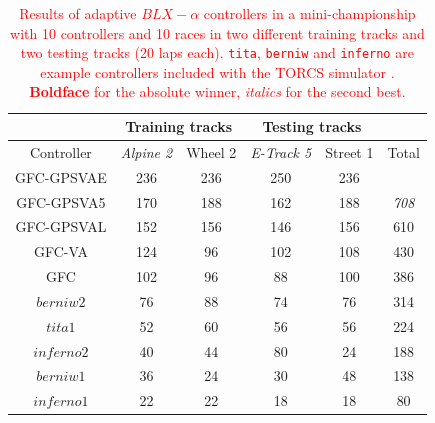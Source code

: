 \documentclass[10pt,journal,compsoc]{IEEEtran}
\begin{document}
%
\begin{table}[h!]
	\centering
	{\scriptsize
          \caption{\textcolor{red}{ Results of adaptive $BLX-\alpha$ controllers in a mini-championship with 10 controllers
          	and 10 races in two different training tracks and two testing tracks (20 laps each). {\tt tita}, {\tt berniw} and {\tt inferno} are example controllers included with the TORCS simulator \cite{torcs4}. {\bf Boldface} for the absolute winner, {\em italics} for the second best.}}
          {
            \begin{tabular}{|c|c|c|c|c||c|}
              \hline
                    & \multicolumn{2}{|c|}{Training tracks} &\multicolumn{2}{|c|}{Testing tracks} \\
              \hline
                    Controller&\textit{Alpine 2} &Wheel 2&\textit{E-Track 5}  &Street 1&Total\\
              \hline
              \hline	
              {\sf GFC-GPSVAE} &\cellcolor{red!25}236&\cellcolor{red!25}	236&\cellcolor{red!25}250&	\cellcolor{red!25}236&\cellcolor{red!25}{\bf 958}\\
              {\sf GFC-GPSVA5} \cite{DBLP:conf/cig/SalemMG19}&\cellcolor{red!25}170&\cellcolor{red!25}	188&\cellcolor{red!25}162&	\cellcolor{red!25}188&\cellcolor{red!25}	{\em 708}\\

				{\sf GFC-GPSVAL} \cite{DBLP:conf/cig/SalemMG19}&\cellcolor{red!25}152&	\cellcolor{red!25}156&\cellcolor{red!25}146&\cellcolor{red!25}	156&\cellcolor{red!25}	610\\

				
				
		{\sf GFC-VA} \cite{DBLP:conf/cig/SalemMG19}&\cellcolor{red!25}124&\cellcolor{red!25}	96 &\cellcolor{red!25}102&\cellcolor{red!25}	108&\cellcolor{red!25}	430\\		
		{\sf GFC}  \cite{salem_cig2018}&\cellcolor{red!25}102&\cellcolor{red!25}	96 &\cellcolor{red!25}88 &\cellcolor{red!25}	100&\cellcolor{red!25}	386\\
		$berniw2$	 &\cellcolor{red!25}76 &\cellcolor{red!25}	88 &\cellcolor{red!25}74 &	\cellcolor{red!25}76 &\cellcolor{red!25}	314\\
		$tita1$	 	&\cellcolor{red!25}52 &	\cellcolor{red!25}60 &\cellcolor{red!25}56 &\cellcolor{red!25}	56 &\cellcolor{red!25}	224\\
		$inferno2$ &\cellcolor{red!25}40 &\cellcolor{red!25}	44 &\cellcolor{red!25}80 &	\cellcolor{red!25}24 &\cellcolor{red!25}	188\\		
		$berniw1$	 &\cellcolor{red!25}36 &\cellcolor{red!25}	24 &\cellcolor{red!25}30 &	\cellcolor{red!25}48 &\cellcolor{red!25}	138\\	
		$inferno1$ &\cellcolor{red!25}22 &\cellcolor{red!25}	22 &\cellcolor{red!25}18 &\cellcolor{red!25}	18 &\cellcolor{red!25}	80\\					\hline			
			\end{tabular}
		}\label{tab:VaryingalphaRSresults}
	}
\end{table}
\end{document}
